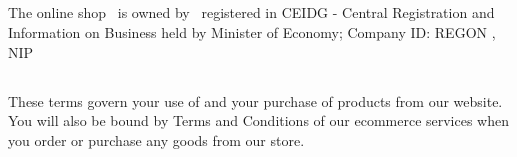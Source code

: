 


		\subsection{} 
		The online shop \shopname\ is owned by \companyname\  registered in CEIDG - Central Registration and Information on Business held by Minister of Economy; Company ID: REGON \regon, NIP \nip
		
		\subsection{} 
		These terms govern your use of \shopname and your purchase of products from our website. You will also be bound by Terms and Conditions of our ecommerce services when you order or purchase any goods from our store. 
